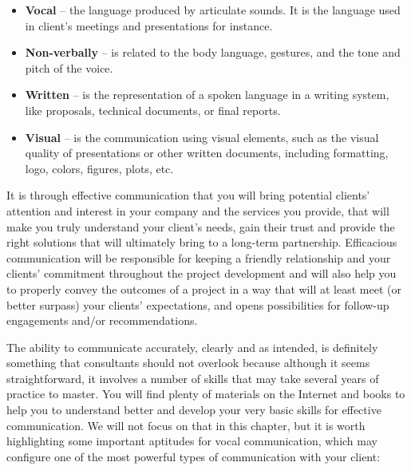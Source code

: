 \documentclass[
]{krantz}
\providecommand{\tightlist}{%
  \setlength{\itemsep}{0pt}\setlength{\parskip}{0pt}}
\begin{document}
\begin{itemize}
\tightlist
\item
  \textbf{Vocal} -- the language produced by articulate sounds. It is the language used in client's meetings and presentations for instance.
\item
  \textbf{Non-verbally} -- is related to the body language, gestures, and the tone and pitch of the voice.
\item
  \textbf{Written} -- is the representation of a spoken language in a writing system, like proposals, technical documents, or final reports.
\item
  \textbf{Visual} -- is the communication using visual elements, such as the visual quality of presentations or other written documents, including formatting, logo, colors, figures, plots, etc.
\end{itemize}

It is through effective communication that you will bring potential clients' attention and interest in your company and the services you provide, that will make you truly understand your client's needs, gain their trust and provide the right solutions that will ultimately bring to a long-term partnership. Efficacious communication will be responsible for keeping a friendly relationship and your clients' commitment throughout the project development and will also help you to properly convey the outcomes of a project in a way that will at least meet (or better surpass) your clients' expectations, and opens possibilities for follow-up engagements and/or recommendations.

The ability to communicate accurately, clearly and as intended, is definitely something that consultants should not overlook because although it seems straightforward, it involves a number of skills that may take several years of practice to master. You will find plenty of materials on the Internet and books to help you to understand better and develop your very basic skills for effective communication. We will not focus on that in this chapter, but it is worth highlighting some important aptitudes for vocal communication, which may configure one of the most powerful types of communication with your client:
\end{document}
